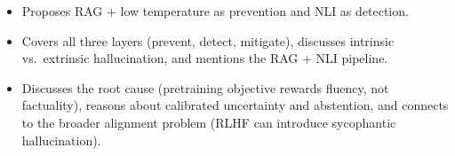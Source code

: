 \begin{interviewq}

\goodgreat
\begin{itemize}
    \item {} Proposes RAG + low temperature as prevention and NLI as detection.
    \item {} Covers all three layers (prevent, detect, mitigate), discusses intrinsic vs.\ extrinsic hallucination, and mentions the RAG + NLI pipeline.
    \item {} Discusses the root cause (pretraining objective rewards fluency, not factuality), reasons about calibrated uncertainty and abstention, and connects to the broader alignment problem (RLHF can introduce sycophantic hallucination).
\end{itemize}

\end{interviewq}


